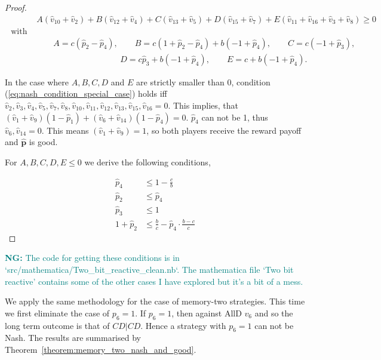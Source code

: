 \documentclass{article}
\theoremstyle{definition}
\newcommand{\nikoleta}[1]{\textcolor{teal}{{\bf NG:} #1}}
\begin{document}
\begin{proof}
  \begin{align}
    & A (\hat{v}_{10} + \hat{v}_{2}) + B (\hat{v}_{12} + \hat{v}_4) 
    + C (\hat{v}_{13} + \hat{v}_5) + D (\hat{v}_{15} + \hat{v}_7) + E (\hat{v}_{11} + \hat{v}_{16} + \hat{v}_3 + \hat{v}_8) \geq  0 \label{eq:nash_condition_special_case} \\ \text{ with } \nonumber \\ 
    & \qquad A = c (\hat{p}_2 - \hat{p}_4), \qquad B = c (1 + \hat{p}_2 - \hat{p}_4) + b (-1 + \hat{p}_4), \qquad C = c (-1 + \hat{p}_3),  \nonumber \\
    & \qquad  \qquad  \qquad \qquad \qquad D = c \hat{p}_3 + b (-1 + \hat{p}_4), \qquad E = c + 
    b (-1 + \hat{p}_4). \nonumber
  \end{align}
  
  In the case where \(A, B, C, D\) and \(E\) are strictly smaller than 0, condition
  (\ref{eq:nash_condition_special_case}) holds iff \(\hat{v}_2, \hat{v}_3,
  \hat{v}_4, \hat{v}_5, \hat{v}_7, \hat{v}_8, \hat{v}_{10},
  \hat{v}_{11}, \allowbreak \hat{v}_{12}, \hat{v}_{13}, \hat{v}_{15}, \hat{v}_{16} =
  0\). This implies, that \((\hat{v}_1 + \hat{v}_9) (1 - \hat{p}_1) + (\hat{v}_6 +
  \hat{v}_{14}) (1 - \hat{p}_4) = 0\). \(\hat{p}_4\) can not be 1, thus \(\hat{v}_6,
  \hat{v}_{14} = 0\). This means \((\hat{v}_1 + \hat{v}_9) = 1\), so both
  players receive the reward payoff and \(\mathbf{\hat{p}}\) is good.
  
  For \(A, B, C, D, E \leq 0\) we derive the following conditions,
  
  \begin{align}\label{eq:nash_conditions}
    \hat{p}_4       & \leq 1 - \frac{c}{b} \\
    \hat{p}_2       & \leq \hat{p}_4 \\
    \hat{p}_3       & \leq 1 \\
    1 + \hat{p}_2 & \leq \frac{b}{c} - \hat{p}_4 \cdot \frac{b - c}{c}
  \end{align}
  
  \end{proof}
  
\nikoleta{The code for getting these conditions is in `src/mathematica/Two\_bit\_reactive\_clean.nb`.
The mathematica file `Two bit reactive' contains some of the other cases I have
explored but it's a bit of a mess.}

We apply the same methodology for the case of memory-two strategies. This time
we first eliminate the case of \(p_6 = 1\). If \(p_6 = 1\), then against AllD
\(v_6\) and so the long term outcome is that of \(CD|CD\).
Hence a strategy with \(p_6 = 1\) can not be
Nash. The results
are summarised by Theorem~\ref{theorem:memory_two_nash_and_good}.
  
\end{document}

